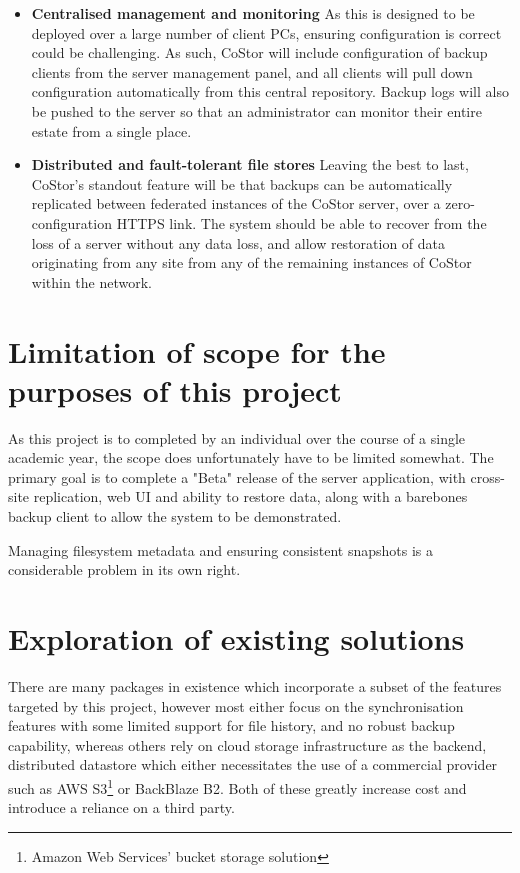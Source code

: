 \documentclass[bsc,frontabs,twoside,singlespacing,parskip,deptreport]{infthesis}     %
\begin{document}
\begin{itemize}
	\item \textbf{Centralised management and monitoring}
		\subitem As this is designed to be deployed over a large number of client PCs,
		ensuring configuration is correct could be challenging. As such, CoStor will include
		configuration of backup clients from the server management panel, and all clients
		will pull down configuration automatically from this central repository. Backup
		logs will also be pushed to the server so that an administrator can monitor their
		entire estate from a single place.
	\item \textbf{Distributed and fault-tolerant file stores}
		\subitem Leaving the best to last, CoStor's standout feature will be that backups
		can be automatically replicated between federated instances of the CoStor server, 
		over a zero-configuration HTTPS link. The system should be able to recover from the
		loss of a server without any data loss, and allow restoration of data originating
		from any site from any of the remaining instances of CoStor within the network.
\end{itemize}

\section{Limitation of scope for the purposes of this project}

As this project is to completed by an individual over the course of a single academic year, 
the scope does unfortunately have to be limited somewhat. The primary goal is to complete
a "Beta" release of the server application, with cross-site replication, web UI and ability
to restore data, along with a barebones backup client to allow the system to be demonstrated.

Managing filesystem metadata and ensuring consistent snapshots is a considerable problem in its
own right.

\clearpage

\section{Exploration of existing solutions}

There are many packages in existence which incorporate a subset of the features targeted
by this project, however most either focus on the synchronisation features with some 
limited support for file history, and no robust backup capability, whereas others rely on
cloud storage infrastructure as the backend, distributed datastore which either necessitates
the use of a commercial provider such as AWS S3\footnote{Amazon Web Services' bucket 
storage solution} or BackBlaze B2. Both of these greatly increase cost and introduce a 
reliance on a third party.
\end{document}
